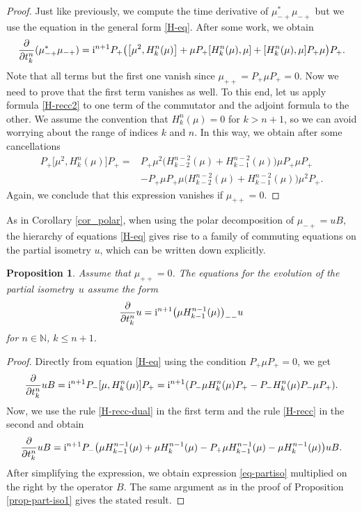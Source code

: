 \documentclass[10pt,a4paper]{amsart}
\newtheorem{prop}[thm]{Proposition}
\theoremstyle{definition}
\numberwithin{equation}{section}
\newcommand{\N}{\mathbb N}
\newcommand{\be}{\begin{equation}}
\newcommand{\ee}{\end{equation}}
\begin{document}
\begin{proof}
Just like previously, we compute
the time derivative of $\mu_{-+}^*\mu_{-+}$ but we use the equation in the general form \eqref{H-eq}. After some work, we obtain
\[
 \frac\partial{\partial t^n_k} (\mu_{-+}^*\mu_{-+}) = {\rm i}^{n+1}P_+\bigl(\bigl[\mu^2,H_k^n(\mu)\bigr] +
\mu P_+ [H^n_k(\mu),\mu] +
[H^n_k(\mu),\mu] P_+ \mu\bigr) P_+.
\]
Note that all terms but the first one vanish since $\mu_{++}=P_+\mu P_+=0$. Now we need to prove that the first term vanishes as well. To this end, let us apply formula \eqref{H-recc2} to one term of the commutator and the adjoint formula
to the other. We assume the convention that $H_k^n(\mu)=0$ for $k>n+1$, so we can avoid worrying about the range of indices $k$ and $n$. In this way, we obtain after some cancellations
\begin{align*}
 P_+\bigl[\mu^2,H_k^n(\mu)\bigr]P_+ ={}&
P_+ \mu^2 \bigl(H^{n-2}_{k-2}(\mu) + H^{n-2}_{k-1}(\mu)\bigr) \mu P_+ \mu P_+\\
& -
P_+ \mu P_+ \mu \bigl(H^{n-2}_{k-2}(\mu) + H^{n-2}_{k-1}(\mu)\bigr) \mu^2 P_+ .
\end{align*}
Again, we conclude that this expression vanishes if $\mu_{++}=0$.
\end{proof}

As in Corollary \ref{cor_polar}, when using the polar decomposition of $\mu_{-+}=uB$, the hierarchy of equations \eqref{H-eq} gives rise to a family of commuting equations on the partial isometry $u$, which can be written down explicitly.

\begin{prop}
Assume that $\mu_{++} = 0$.
The equations for the evolution of the partial isometry~$u$ assume the form
\be \label{eq-partiso} \frac\partial{\partial t^n_k} u = {\rm i}^{n+1}\bigl(\mu H^{n-1}_{k-1}(\mu)\bigr)_{--}u\ee
for $n\in\N$, $k\leq n+1$.
\end{prop}
\begin{proof}
Directly from equation \eqref{H-eq} using the condition $P_+ \mu P_+ = 0$, we get
\[
 \frac\partial{\partial t^n_k} uB = {\rm i}^{n+1}P_-[\mu, H^n_k(\mu)]P_+ =
{\rm i}^{n+1}(P_-\mu H^n_k(\mu) P_+ - P_- H^n_k(\mu) P_- \mu P_+).\]
Now, we use the rule \eqref{H-recc-dual} in the first term and the rule \eqref{H-recc} in the second and obtain
\[
 \frac\partial{\partial t^n_k} uB = {\rm i}^{n+1}P_-\bigl(\mu H^{n-1}_{k-1}(\mu) + \mu H^{n-1}_{k}(\mu)
-P_+\mu H^{n-1}_{k-1}(\mu) - \mu H^{n-1}_k(\mu)\bigr)uB.\]
After simplifying the expression, we obtain expression \eqref{eq-partiso} multiplied on the right by the operator $B$. The same argument as in the proof of Proposition \ref{prop-part-iso1} gives the stated result.
\end{proof}
\end{document}
